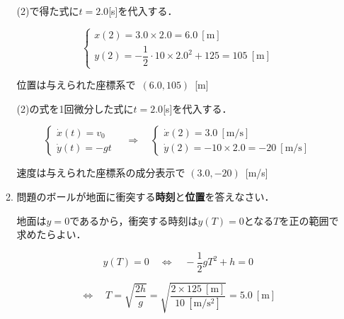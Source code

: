 \documentclass[a4paper,11pt]{ltjsarticle}
\begin{document}
\begin{enumerate}
\begin{enumerate}[label=(\arabic*)]
        \vspace{5pt}

        (2)で得た式に$t=2.0$[s]を代入する．

        \begin{equation*}
            \begin{cases}
                x(2)=3.0 \times 2.0=6.0\ [\mathrm{m}] \\
                y(2)=-\dfrac{1}{2} \cdot 10 \times 2.0^2+125=105\ [\mathrm{m}]
            \end{cases}
        \end{equation*}

        位置は与えられた座標系で\ $(6.0,105)$\ [m]

        \vspace{5pt}

        (2)の式を1回微分した式に$t=2.0$[s]を代入する．

        \begin{equation*}
            \begin{cases}
                \dot{x}(t)=v_0 \\
                \dot{y}(t)=-gt
            \end{cases}
            \quad \Rightarrow \quad
            \begin{cases}
                \dot{x}(2)=3.0\ [\mathrm{m/s}] \\
                \dot{y}(2)=-10 \times 2.0 = -20\ [\mathrm{m/s}]
            \end{cases}
        \end{equation*}

        速度は与えられた座標系の成分表示で $(3.0,-20)$\ [m/s]

        \vspace{5pt}

        \item 問題のボールが地面に衝突する\textbf{時刻}と\textbf{位置}を答えなさい．
        
        \vspace{5pt}

        地面は$y=0$であるから，衝突する時刻は$y(T)=0$となる$T$を正の範囲で求めたらよい．

        \begin{equation*}
            y(T)=0 \quad \Leftrightarrow \quad
            -\dfrac{1}{2}gT^2+h=0
        \end{equation*}

        \begin{equation*}
            \Leftrightarrow \quad T=\sqrt{\dfrac{2h}{g}}
            = \sqrt{\dfrac{2 \times 125\ [\mathrm{m}]}{10\ [\mathrm{m/s^2}]}}=5.0\ [\mathrm{m}]
        \end{equation*}


\end{enumerate}
\end{enumerate}
\end{document}
